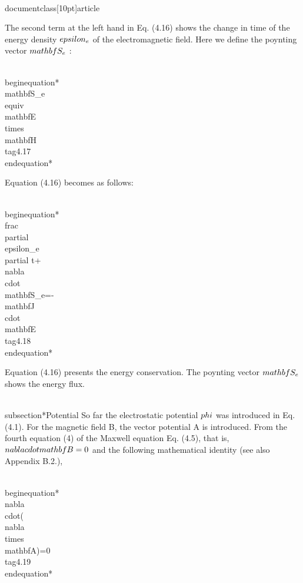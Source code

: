 \\documentclass[10pt]{article}
\begin{document}
The second term at the left hand in Eq. (4.16) shows the change in time of the energy density $\\epsilon_{e}$ of the electromagnetic field. Here we define the poynting vector $\\mathbf{S}_{e}$ :


\\begin{equation*}
\\mathbf{S}_{e} \\equiv \\mathbf{E} \\times \\mathbf{H} \\tag{4.17}
\\end{equation*}


Equation (4.16) becomes as follows:


\\begin{equation*}
\\frac{\\partial \\epsilon_{e}}{\\partial t}+\\nabla \\cdot \\mathbf{S}_{e}=-\\mathbf{J} \\cdot \\mathbf{E} \\tag{4.18}
\\end{equation*}


Equation (4.16) presents the energy conservation. The poynting vector $\\mathbf{S}_{e}$ shows the energy flux.

\\subsection*{Potential}
So far the electrostatic potential $\\phi$ was introduced in Eq. (4.1). For the magnetic field B, the vector potential A is introduced. From the fourth equation (4) of the Maxwell equation Eq. (4.5), that is, $\\nabla \\cdot \\mathbf{B}=0$ and the following mathematical identity (see also Appendix B.2.),


\\begin{equation*}
\\nabla \\cdot(\\nabla \\times \\mathbf{A})=0 \\tag{4.19}
\\end{equation*}
\end{document}
